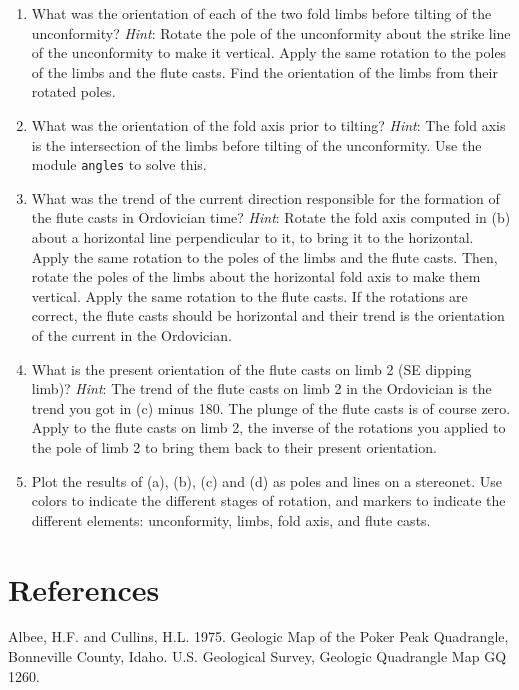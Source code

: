 \documentclass[a4paper , 12pt]{book}
\newcommand{\code}[1]{\colorbox{light-gray}{\texttt{#1}}}
\begin{document}
\begin{enumerate}
    \begin{enumerate}
        \item What was the orientation of each of the two fold limbs before tilting of the unconformity? \textit{Hint}: Rotate the pole of the unconformity about the strike line of the unconformity to make it vertical. Apply the same rotation to the poles of the limbs and the flute casts. Find the orientation of the limbs from their rotated poles.
        \item What was the orientation of the fold axis prior to tilting? \textit{Hint}: The fold axis is the intersection of the limbs before tilting of the unconformity. Use the module \code{angles} to solve this. 
        \item What was the trend of the current direction responsible for the formation of the flute casts in Ordovician time? \textit{Hint}: Rotate the fold axis computed in (b) about a horizontal line perpendicular to it, to bring it to the horizontal. Apply the same rotation to the poles of the limbs and the flute casts. Then, rotate the poles of the limbs about the horizontal fold axis to make them vertical. Apply the same rotation to the flute casts. If the rotations are correct, the flute casts should be horizontal and their trend is the orientation of the current in the Ordovician.
        \item What is the present orientation of the flute casts on limb 2 (SE dipping limb)? \textit{Hint}: The trend of the flute casts on limb 2 in the Ordovician is the trend you got in (c) minus 180\degree. The plunge of the flute casts is of course zero. Apply to the flute casts on limb 2, the inverse of the rotations you applied to the pole of limb 2 to bring them back to their present orientation.
        \item Plot the results of (a), (b), (c) and (d) as poles and lines on a stereonet. Use colors to indicate the different stages of rotation, and markers to indicate the different elements: unconformity, limbs, fold axis, and flute casts.
    \end{enumerate}{}
    
\end{enumerate}

\section*{References}

Albee, H.F. and Cullins, H.L. 1975. Geologic Map of the Poker Peak Quadrangle, Bonneville County, Idaho. U.S. Geological Survey, Geologic Quadrangle Map GQ 1260. 
\end{document}
